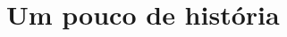 \documentclass[../Notas.tex]{subfiles}
\begin{document}
\section{Um pouco de história}
\end{document}
